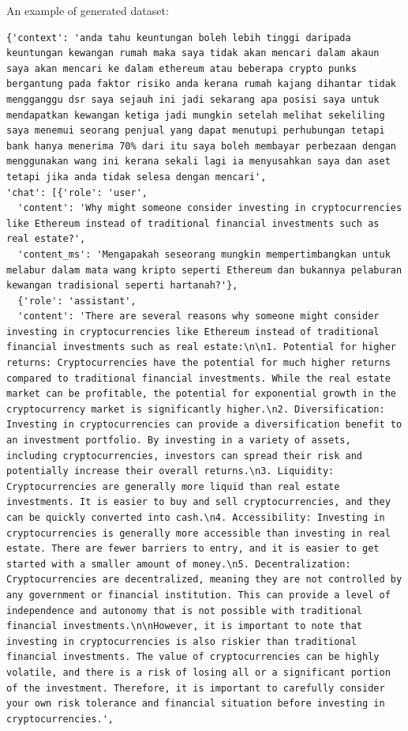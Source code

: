 \documentclass[preprint]{article}
\begin{document}
An example of generated dataset:

\begin{lstlisting}[breaklines=true]
{'context': 'anda tahu keuntungan boleh lebih tinggi daripada keuntungan kewangan rumah maka saya tidak akan mencari dalam akaun saya akan mencari ke dalam ethereum atau beberapa crypto punks bergantung pada faktor risiko anda kerana rumah kajang dihantar tidak mengganggu dsr saya sejauh ini jadi sekarang apa posisi saya untuk mendapatkan kewangan ketiga jadi mungkin setelah melihat sekeliling saya menemui seorang penjual yang dapat menutupi perhubungan tetapi bank hanya menerima 70% dari itu saya boleh membayar perbezaan dengan menggunakan wang ini kerana sekali lagi ia menyusahkan saya dan aset tetapi jika anda tidak selesa dengan mencari',
'chat': [{'role': 'user',
  'content': 'Why might someone consider investing in cryptocurrencies like Ethereum instead of traditional financial investments such as real estate?',
  'content_ms': 'Mengapakah seseorang mungkin mempertimbangkan untuk melabur dalam mata wang kripto seperti Ethereum dan bukannya pelaburan kewangan tradisional seperti hartanah?'},
  {'role': 'assistant',
  'content': 'There are several reasons why someone might consider investing in cryptocurrencies like Ethereum instead of traditional financial investments such as real estate:\n\n1. Potential for higher returns: Cryptocurrencies have the potential for much higher returns compared to traditional financial investments. While the real estate market can be profitable, the potential for exponential growth in the cryptocurrency market is significantly higher.\n2. Diversification: Investing in cryptocurrencies can provide a diversification benefit to an investment portfolio. By investing in a variety of assets, including cryptocurrencies, investors can spread their risk and potentially increase their overall returns.\n3. Liquidity: Cryptocurrencies are generally more liquid than real estate investments. It is easier to buy and sell cryptocurrencies, and they can be quickly converted into cash.\n4. Accessibility: Investing in cryptocurrencies is generally more accessible than investing in real estate. There are fewer barriers to entry, and it is easier to get started with a smaller amount of money.\n5. Decentralization: Cryptocurrencies are decentralized, meaning they are not controlled by any government or financial institution. This can provide a level of independence and autonomy that is not possible with traditional financial investments.\n\nHowever, it is important to note that investing in cryptocurrencies is also riskier than traditional financial investments. The value of cryptocurrencies can be highly volatile, and there is a risk of losing all or a significant portion of the investment. Therefore, it is important to carefully consider your own risk tolerance and financial situation before investing in cryptocurrencies.',

\end{lstlisting}
\end{document}
